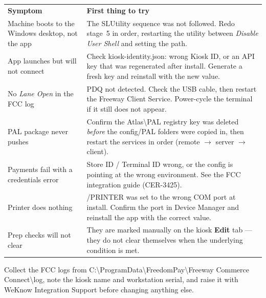 \documentclass[a4paper,10pt]{article}
\newcommand{\wpath}[1]{{\ttfamily\small #1}}
\begin{document}
\begin{center}
\renewcommand{\arraystretch}{1.35}\small
\begin{tabularx}{\textwidth}{L{54mm} X}
\color{white}\textbf{Symptom} &
\color{white}\textbf{First thing to try}\\
Machine boots to the Windows desktop, not the app &
The \wpath{SLUtility} sequence was not followed. Redo stage~5 in order,
restarting the utility between \emph{Disable User Shell} and setting the
path.\\
App launches but will not connect &
Check \wpath{kiosk-identity.json}: wrong Kiosk ID, or an API key that was
regenerated after install. Generate a fresh key and reinstall with the
new value.\\
No \emph{Lane Open} in the FCC log &
PDQ not detected. Check the USB cable, then restart the Freeway Client
Service. Power-cycle the terminal if it still does not appear.\\
PAL package never pushes &
Confirm the \wpath{Atlas\textbackslash PAL} registry key was deleted
\emph{before} the config/PAL folders were copied in, then restart the
services in order (remote $\rightarrow$ server $\rightarrow$ client).\\
Payments fail with a credentials error &
Store ID / Terminal ID wrong, or the config is pointing at the wrong
environment. See the FCC integration guide (CER-3425).\\
Printer does nothing &
\wpath{/PRINTER} was set to the wrong COM port at install. Confirm the
port in Device Manager and reinstall the app with the correct value.\\
Prep checks will not clear &
They are marked manually on the kiosk \textbf{Edit} tab --- they do not
clear themselves when the underlying condition is met.\\
\end{tabularx}
\end{center}

\begin{wkinfo}
Collect the FCC logs from
\wpath{C:\textbackslash ProgramData\textbackslash FreedomPay\textbackslash Freeway Commerce Connect\textbackslash log},
note the kiosk name and workstation serial, and raise it with WeKnow
Integration Support before changing anything else.
\end{wkinfo}
\end{document}
